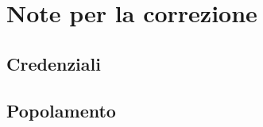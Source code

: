 \appendix
    \section{Note per la correzione}
    \subsection{Credenziali}
    \subsection{Popolamento}
\pagebreak